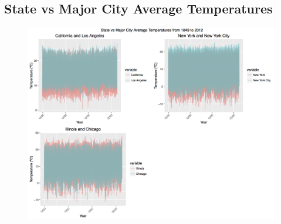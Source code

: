\documentclass[12pt]{article}
\begin{document}
\subsection{State vs Major City Average Temperatures} \label{sec:stateCity}
\begin{figure}[H]
    \centering
    \includegraphics[width=\textwidth]{Figures/stateCity.png}
\end{figure}
\end{document}
